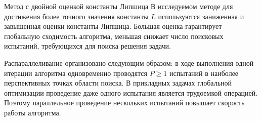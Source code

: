 \documentclass{beamer}
\begin{document}
\begin{frame}[t]
\begin{columns}[t]
\begin{column}[t]{0.465\paperwidth}
\begin{block}{Метод с  двойной оценкой константы Липшица}
В исследуемом методе для достижения более точного значения константы \(L\) используются заниженная и завышенная оценки константы Липшица\cite{Strongin2020}. Большая оценка гарантирует глобальную сходимость алгоритма, меньшая снижает число поисковых испытаний, требующихся для поиска решения задачи.

Распараллеливание организовано следующим образом: в ходе выполнения одной итерации алгоритма одновременно проводятся \(P \geq 1\) испытаний в наиболее перспективных точках области поиска. В прикладных задачах глобальной оптимизации проведение даже одного испытания является трудоемкой операцией. Поэтому параллельное проведение нескольких испытаний повышает скорость работы алгоритма. 
\leftskip=0.001cm 
\setlength{\parindent}{0.001cm}
 \begin{minipage}[t]{0.96\textwidth}
              \begin{figure}
              \end{figure}
              \end{minipage}
\end{block}
            

\end{column}
\end{columns}
\end{frame}
\end{document}
